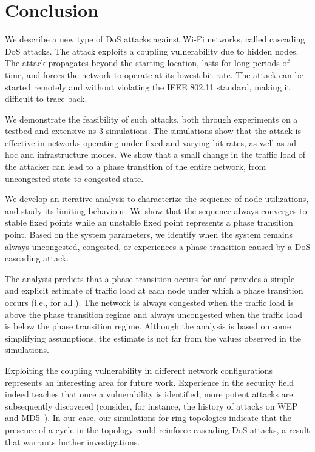 \documentclass{IEEEtran}
\begin{document}
\section{Conclusion}
\label{Conclusion}
We describe a new type of DoS attacks against Wi-Fi networks, called cascading DoS attacks.
The attack exploits a coupling vulnerability due to hidden nodes.
The attack propagates beyond the starting location, lasts for long periods of
time, and forces the network to operate at its lowest bit rate. The attack can be started
remotely and without violating the IEEE 802.11 standard, making it
difficult to trace back.

We demonstrate the feasibility of such attacks, both through experiments on a testbed and extensive ns-3 simulations.
The simulations show that the attack is effective in networks operating under fixed and varying bit rates, as well
as ad hoc and infrastructure modes. We show that a small change
in the traffic load of the attacker can lead to a phase transition of the entire network, from uncongested state to congested state.

We develop an iterative analysis to characterize the sequence of node utilizations, and study its limiting behaviour. We show that the sequence
always converges to stable fixed points while an unstable fixed point represents a phase transition point. Based on the system parameters, we
identify when the system remains always uncongested, congested, or experiences a phase transition caused by a DoS cascading attack.

The analysis predicts that a phase transition occurs for  and provides a simple and explicit estimate of traffic load at each node under
which a phase transition occurs  (i.e.,  for all ). The network is always congested when the traffic load is
above the phase transition regime and always uncongested when the traffic load is below the phase transition regime. Although the analysis is based
on some simplifying assumptions, the estimate is not far from the values observed in the simulations.



Exploiting the coupling vulnerability in different network configurations represents an interesting area for future work.
Experience in the security field indeed teaches that once a vulnerability is identified, more  potent attacks are subsequently discovered
(consider,
for instance, the history of attacks on WEP~\cite{tews2007breaking} and MD5~\cite{black2006study}). In our case, our simulations for ring topologies
indicate that the presence of a cycle in the topology could reinforce cascading DoS attacks, a result that warrants further investigations.
\end{document}
